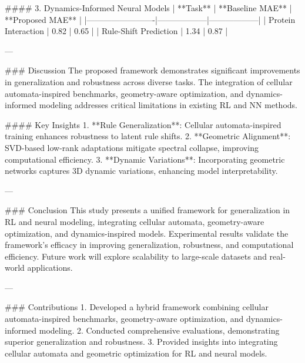 #### 3. Dynamics-Informed Neural Models  
| **Task**                | **Baseline MAE** | **Proposed MAE** |  
|-------------------------|------------------|------------------|  
| Protein Interaction     | 0.82            | 0.65            |  
| Rule-Shift Prediction    | 1.34            | 0.87            |  

---

### Discussion  
The proposed framework demonstrates significant improvements in generalization and robustness across diverse tasks. The integration of cellular automata-inspired benchmarks, geometry-aware optimization, and dynamics-informed modeling addresses critical limitations in existing RL and NN methods.  

#### Key Insights  
1. **Rule Generalization**: Cellular automata-inspired training enhances robustness to latent rule shifts.  
2. **Geometric Alignment**: SVD-based low-rank adaptations mitigate spectral collapse, improving computational efficiency.  
3. **Dynamic Variations**: Incorporating geometric networks captures 3D dynamic variations, enhancing model interpretability.  

---

### Conclusion  
This study presents a unified framework for generalization in RL and neural modeling, integrating cellular automata, geometry-aware optimization, and dynamics-inspired models. Experimental results validate the framework's efficacy in improving generalization, robustness, and computational efficiency. Future work will explore scalability to large-scale datasets and real-world applications.  

---

### Contributions  
1. Developed a hybrid framework combining cellular automata-inspired benchmarks, geometry-aware optimization, and dynamics-informed modeling.  
2. Conducted comprehensive evaluations, demonstrating superior generalization and robustness.  
3. Provided insights into integrating cellular automata and geometric optimization for RL and neural models.  